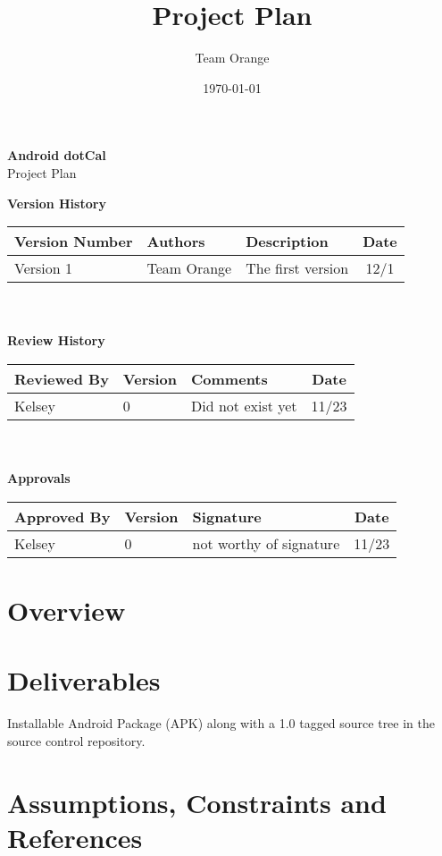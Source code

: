 \documentclass[11pt]{article}
\title{Project Plan}
\author{Team Orange}
\date{\today}
\begin{document}
\begin{centering}
\textbf{\huge{Android dotCal}}\\
\LARGE{Project Plan}

\end{centering}


\vspace{1cm}
\textbf{\large{Version History}}

\begin{tabular}{|l|l|l|c|}
\hline
Version Number & Authors & Description & Date\\
\hline
Version 1 & Team Orange & The first version & 12/1 \\
\hline
\end{tabular}\\\\

\textbf{\large{Review History}}

\begin{tabular}{|l|l|l|c|}
\hline
Reviewed By & Version & Comments & Date\\
\hline
Kelsey & 0 & Did not exist yet & 11/23 \\
\hline
\end{tabular}\\\\

\textbf{\large{Approvals}}

\begin{tabular}{|l|l|l|c|}
\hline
Approved By & Version & Signature & Date\\
\hline
Kelsey & 0 & not worthy of signature & 11/23 \\
\hline
\end{tabular}


\section{Overview}

\section{Deliverables}
Installable Android Package (APK) along with a 1.0 tagged source tree in the source control repository.
\section{Assumptions, Constraints and References}
\end{document}
